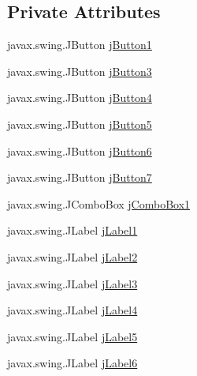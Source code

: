 \subsection*{Private Attributes}
\begin{DoxyCompactItemize}
\item 
javax.\+swing.\+J\+Button \mbox{\hyperlink{class_interfaz_package_1_1_consulta_busqueda_a8cbb600ad394d0017b1f7fd24090eae5}{j\+Button1}}
\item 
javax.\+swing.\+J\+Button \mbox{\hyperlink{class_interfaz_package_1_1_consulta_busqueda_ad28b7024dc55d1785ac611b91dab6030}{j\+Button3}}
\item 
javax.\+swing.\+J\+Button \mbox{\hyperlink{class_interfaz_package_1_1_consulta_busqueda_a3c5a2c3d6a507e80ad771d8ab4ebd891}{j\+Button4}}
\item 
javax.\+swing.\+J\+Button \mbox{\hyperlink{class_interfaz_package_1_1_consulta_busqueda_a92a758e63cc825dd1292869d625115dd}{j\+Button5}}
\item 
javax.\+swing.\+J\+Button \mbox{\hyperlink{class_interfaz_package_1_1_consulta_busqueda_a7cf19c14b7eb6a2bd1e460fcce0c2ffa}{j\+Button6}}
\item 
javax.\+swing.\+J\+Button \mbox{\hyperlink{class_interfaz_package_1_1_consulta_busqueda_a80ca243a28d5b45e1f3a0e97c5cfb819}{j\+Button7}}
\item 
javax.\+swing.\+J\+Combo\+Box \mbox{\hyperlink{class_interfaz_package_1_1_consulta_busqueda_ab0737507a855f158ca16439d3df67b4e}{j\+Combo\+Box1}}
\item 
javax.\+swing.\+J\+Label \mbox{\hyperlink{class_interfaz_package_1_1_consulta_busqueda_a53ca3d311b9b50620390029bffe04529}{j\+Label1}}
\item 
javax.\+swing.\+J\+Label \mbox{\hyperlink{class_interfaz_package_1_1_consulta_busqueda_a875cc70442f93c7e077251d0fb0f30f9}{j\+Label2}}
\item 
javax.\+swing.\+J\+Label \mbox{\hyperlink{class_interfaz_package_1_1_consulta_busqueda_ac2ce384e0d5b1405b8a3cfec2683a020}{j\+Label3}}
\item 
javax.\+swing.\+J\+Label \mbox{\hyperlink{class_interfaz_package_1_1_consulta_busqueda_a2b841f08ba3d614049012b4b67130909}{j\+Label4}}
\item 
javax.\+swing.\+J\+Label \mbox{\hyperlink{class_interfaz_package_1_1_consulta_busqueda_aa93cd22be90131fea76b2a1b2f113b9b}{j\+Label5}}
\item 
javax.\+swing.\+J\+Label \mbox{\hyperlink{class_interfaz_package_1_1_consulta_busqueda_ab5f2ed2b4cd6da7ed4e68ab08caabf65}{j\+Label6}}

\end{DoxyCompactItemize}
